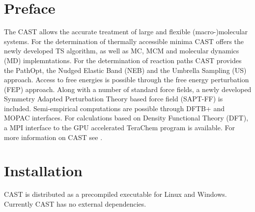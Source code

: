 \documentclass[10pt,a4paper]{article} %
\newif\ifdevmode %
\begin{document}
	\section{Preface}
	The \ac{CAST} allows the accurate treatment of large and flexible (macro-)molecular systems. For the determination of thermally accessible minima \ac{CAST} offers the newly developed \ac{TS} algorithm\supercite{tabusearch}, as well as \ac{MC}\supercite{mc_original}, \ac{MCM} and molecular dynamics (MD) implemntations. For the determination of reaction paths CAST provides the PathOpt, the Nudged Elastic Band (NEB) and the Umbrella Sampling (US) approach. Access to free energies is possible through the free energy perturbation (FEP) approach. Along with a number of standard force fields, a newly developed Symmetry Adapted Perturbation Theory based force field (SAPT-FF) is included. Semi-empirical computations are possible through DFTB+ and MOPAC interfaces. For calculations based on Density Functional Theory (DFT), a MPI interface to the GPU accelerated TeraChem program is available. For more information on CAST see \cite{cast}.
	\newpage


	\ifdevmode
	\section{Compiling CAST}
	The CAST source code is not openly distributed. Currently, CAST has no external dependencies. Compilation was verified using Microsoft Visual Studio 2015 Update 1 on Windows 10 and GCC 5.3 on SuseLinux. A makefile for LINUX operating systems is part of the source code repository.
	\fi
	\newpage

	\section{Installation}
	CAST is distributed as a precompiled executable for Linux and Windows. Currently CAST has no external dependencies.
\end{document}
